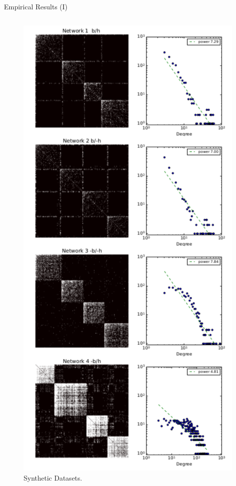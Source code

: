 \begin{frame}[c]{Empirical Results (I)}

    \vspace{-0.2cm}

    \begin{columns}[t]
        \begin{column}{0.5\textwidth}
        \begin{figure}[h]
            \caption{Synthetic Datasets.}
        \includegraphics[scale=0.2]{img/burst_sint.pdf}

\end{figure}
\end{column}
\end{columns}
\end{frame}
